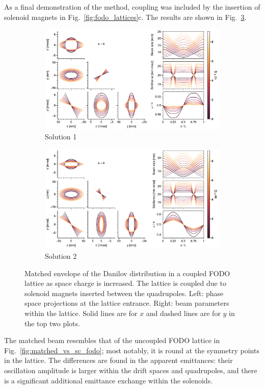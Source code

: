 As a final demonstration of the method, coupling was included by the insertion of solenoid magnets in Fig.~\ref{fig:fodo_lattices}c. The results are shown in Fig.~\ref{fig:matched_vs_sc_fodo_sol}.
%
\begin{figure}[!p]
    \begin{subfigure}{1.0\textwidth}
        \includegraphics[width=\textwidth]{Images/chapter2/matched_vs_sc_fodo_sol_mode1.pdf}
        \caption{Solution 1}
        \label{fig:matched_vs_sc_fodo_sol_a}
    \end{subfigure}
    \vfill
    \vfill
    \begin{subfigure}{1.0\textwidth}
        \centering
        \includegraphics[width=\textwidth]{Images/chapter2/matched_vs_sc_fodo_sol_mode2.pdf}
        \caption{Solution 2}
        \label{fig:matched_vs_sc_fodo_sol_b}
    \end{subfigure}
    \caption{Matched envelope of the Danilov distribution in a coupled FODO lattice as space  charge is increased. The lattice is coupled due to solenoid magnets inserted between the quadrupoles. Left: phase space projections at the lattice entrance. Right: beam parameters within the lattice. Solid lines are for $x$ and dashed lines are for $y$ in the top two plots.}
    \label{fig:matched_vs_sc_fodo_sol}
\end{figure}
%
The matched beam resembles that of the uncoupled FODO lattice in Fig.~\ref{fig:matched_vs_sc_fodo}; most notably, it is round at the symmetry points in the lattice. The differences are found in the apparent emittances: their oscillation amplitude is larger within the drift spaces and quadrupoles, and there is a significant additional emittance exchange within the solenoids. 


